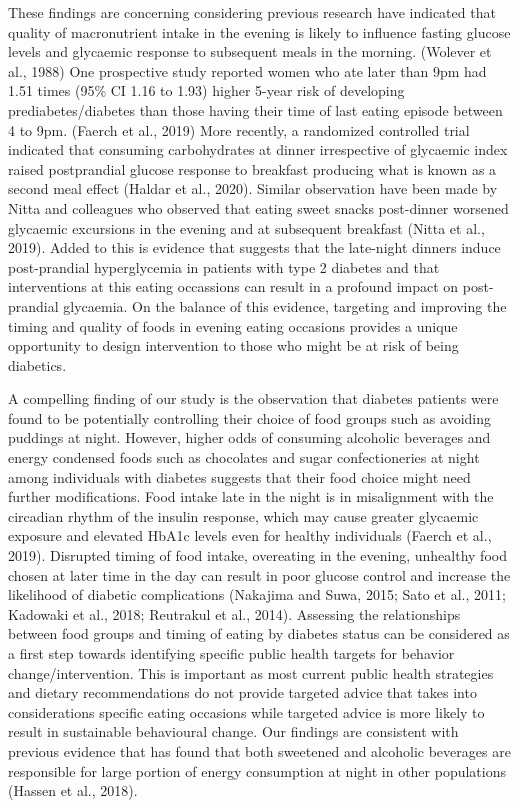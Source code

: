\documentclass[utf8]{frontiersSCNS}
\begin{document}
These findings are concerning considering previous research have
indicated that quality of macronutrient intake in the evening is likely
to influence fasting glucose levels and glycaemic response to subsequent
meals in the morning. (Wolever et al., 1988) One prospective study
reported women who ate later than 9pm had 1.51 times (95\% CI 1.16 to
1.93) higher 5-year risk of developing prediabetes/diabetes than those
having their time of last eating episode between 4 to 9pm. (Faerch et
al., 2019) More recently, a randomized controlled trial indicated that
consuming carbohydrates at dinner irrespective of glycaemic index raised
postprandial glucose response to breakfast producing what is known as a
second meal effect (Haldar et al., 2020). Similar observation have been
made by Nitta and colleagues who observed that eating sweet snacks
post-dinner worsened glycaemic excursions in the evening and at
subsequent breakfast (Nitta et al., 2019). Added to this is evidence
that suggests that the late-night dinners induce post-prandial
hyperglycemia in patients with type 2 diabetes and that interventions at
this eating occassions can result in a profound impact on post-prandial
glycaemia. On the balance of this evidence, targeting and improving the
timing and quality of foods in evening eating occasions provides a
unique opportunity to design intervention to those who might be at risk
of being diabetics.

A compelling finding of our study is the observation that diabetes
patients were found to be potentially controlling their choice of food
groups such as avoiding puddings at night. However, higher odds of
consuming alcoholic beverages and energy condensed foods such as
chocolates and sugar confectioneries at night among individuals with
diabetes suggests that their food choice might need further
modifications. Food intake late in the night is in misalignment with the
circadian rhythm of the insulin response, which may cause greater
glycaemic exposure and elevated HbA1c levels even for healthy
individuals (Faerch et al., 2019). Disrupted timing of food intake,
overeating in the evening, unhealthy food chosen at later time in the
day can result in poor glucose control and increase the likelihood of
diabetic complications (Nakajima and Suwa, 2015; Sato et al., 2011;
Kadowaki et al., 2018; Reutrakul et al., 2014). Assessing the
relationships between food groups and timing of eating by diabetes
status can be considered as a first step towards identifying specific
public health targets for behavior change/intervention. This is
important as most current public health strategies and dietary
recommendations do not provide targeted advice that takes into
considerations specific eating occasions while targeted advice is more
likely to result in sustainable behavioural change. Our findings are
consistent with previous evidence that has found that both sweetened and
alcoholic beverages are responsible for large portion of energy
consumption at night in other populations (Hassen et al., 2018).
\end{document}
